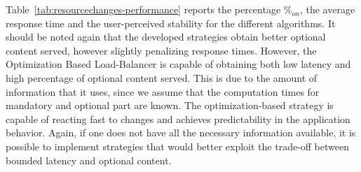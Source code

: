 Table~\ref{tab:resourcechanges-performance} reports the percentage
$\%_{on}$, the average response time and the user-perceived stability
for the different algorithms. It should be noted again that the
developed strategies obtain better optional content served, however
slightly penalizing response times. However, the Optimization Based
Load-Balancer is capable of obtaining both low latency and high
percentage of optional content served. This is due to the amount of
information that it uses, since we assume that the computation times
for mandatory and optional part are known. The optimization-based
strategy is capable of reacting fast to changes and achieves
predictability in the application behavior. Again, if one does not
have all the necessary information available, it is possible to
implement strategies that would better exploit the trade-off between
bounded latency and optional content.
